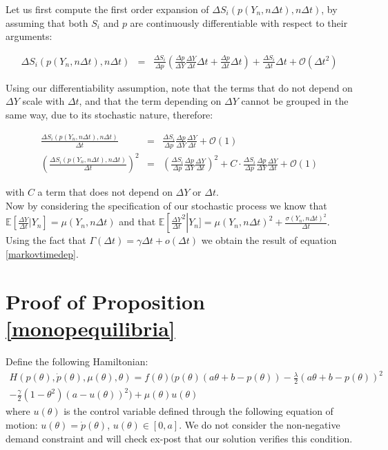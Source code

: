 \begin{subappendices}
Let us first compute the first order expansion of $\Delta S_i(p(Y_n,n\Delta t),n \Delta t)$, by assuming that both $S_i$ and $p$ are continuously differentiable with respect to their arguments:
\begin{small}
\begin{eqnarray}
\Delta S_i(p(Y_n,n\Delta t),n \Delta t) &=& \frac{\Delta S_i}{\Delta p}\left( \frac{\Delta p}{\Delta Y}\frac{\Delta Y}{\Delta t}\Delta t+ \frac{\Delta p}{\Delta t}\Delta t\right) + \frac{\Delta S_i}{\Delta t}
\Delta t +\mathcal{O}(\Delta t^2)
 \end{eqnarray}
 \end{small}
Using our differentiability assumption, note that the terms that do not depend on $\Delta Y$ scale with $\Delta t$, and that the term depending on $\Delta Y$ cannot be grouped in the same way, due to its stochastic nature, therefore:
\begin{small}
\begin{eqnarray}
\frac{\Delta S_i(p(Y_n,n\Delta t),n \Delta t) }{\Delta t} &=& \frac{\Delta S_i}{\Delta p} \frac{\Delta p}{\Delta Y}\frac{\Delta Y}{\Delta t}+\mathcal{O}(1)\\
 \left(\frac{\Delta S_i(p(Y_n,n\Delta t),n \Delta t)}{\Delta t}\right)^2 &=& \left(\frac{\Delta S_i}{\Delta p} \frac{\Delta p}{\Delta Y}\frac{\Delta Y}{\Delta t}\right)^2+ C\cdot \frac{\Delta S_i}{\Delta p} \frac{\Delta p}{\Delta Y}\frac{\Delta Y}{\Delta t} + \mathcal{O}(1)
 \end{eqnarray}
 \end{small}
 with $C$ a term that does not depend on $\Delta Y$ or $\Delta t$.\\
 
Now by considering the specification of our stochastic process we know that $\mathbb{E}\left[\frac{\Delta Y}{\Delta t}\vert Y_n\right]=\mu(Y_n,n \Delta t)$ and that $\mathbb{E}\left[\frac{\Delta Y}{\Delta t}^2 \right\vert Y_n]=\mu(Y_n,n \Delta t)^2 + \frac{\sigma (Y_n,n \Delta t)^2}{\Delta t}$. 
Using the fact that $\Gamma(\Delta t) = \gamma \Delta t + o(\Delta t)$ we obtain the result of equation \ref{markovtimedep}.


\section{Proof of Proposition \ref{monopequilibria} \label{annexmonop}}
Define the following Hamiltonian: 
\begin{equation}
\begin{split}
H(p(\theta),\dot{p}(\theta),\mu(\theta),\theta)= f(\theta)\bigg( p(\theta)(a\theta+b-p(\theta))-\frac{\lambda}{2}(a\theta+b-p(\theta))^2\\
-\frac{\gamma}{2}(1-\theta^2)\left(a-u(\theta)\right)^2\bigg)+\mu(\theta) u(\theta)
\end{split}
\end{equation}
where $u(\theta)$ is the control variable defined through the following equation of motion: $u(\theta)=\dot{p}(\theta)$, $u(\theta)\in[0,a]$. We do not consider the non-negative demand constraint and will check ex-post that our solution verifies this condition. \\


\end{subappendices}
